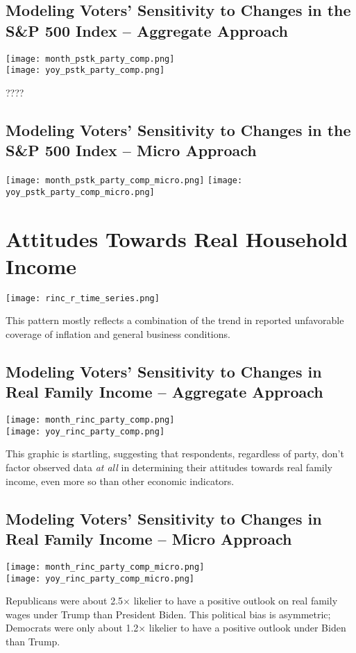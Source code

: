 \documentclass{article}
\begin{document}
\subsection{Modeling Voters' Sensitivity to Changes in the S\&P 500 Index -- Aggregate Approach}
\centering \texttt{[image: month\_pstk\_party\_comp.png]} \\
\texttt{[image: yoy\_pstk\_party\_comp.png]} \\
\raggedright ????

\subsection{Modeling Voters' Sensitivity to Changes in the S\&P 500 Index -- Micro Approach}
\centering \texttt{[image: month\_pstk\_party\_comp\_micro.png]}
\texttt{[image: yoy\_pstk\_party\_comp\_micro.png]} \\
\raggedright 

\section{Attitudes Towards Real Household Income}
\centering \texttt{[image: rinc\_r\_time\_series.png]} \\
\raggedright This pattern mostly reflects a combination of the trend in reported unfavorable coverage of inflation and general business conditions.

\subsection{Modeling Voters' Sensitivity to Changes in Real Family Income -- Aggregate Approach}
\centering \texttt{[image: month\_rinc\_party\_comp.png]} \\
\texttt{[image: yoy\_rinc\_party\_comp.png]} \\
\raggedright This graphic is startling, suggesting that respondents, regardless of party, don't factor observed data \textit{at all} in determining their attitudes towards real family income, even more so than other economic indicators. 

\subsection{Modeling Voters' Sensitivity to Changes in Real Family Income -- Micro Approach}
\centering \texttt{[image: month\_rinc\_party\_comp\_micro.png]} \\
\texttt{[image: yoy\_rinc\_party\_comp\_micro.png]} \\
\raggedright Republicans were about 2.5$\times$ likelier to have a positive outlook on real family wages under Trump than President Biden. This political bias is asymmetric; Democrats were only about 1.2$\times$ likelier to have a positive outlook under Biden than Trump.
\end{document}
